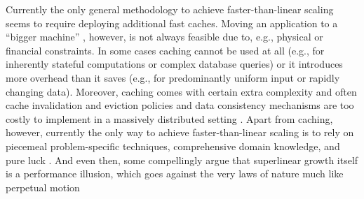 Currently the only general methodology to achieve faster-than-linear scaling seems to require deploying additional fast caches. Moving an application to a ``bigger machine'' \cite{dobb-2}, however, is not always feasible due to, e.g., physical or financial constraints.  In some cases caching cannot be used at all (e.g., for inherently stateful computations or complex database queries) or it introduces more overhead than it saves (e.g., for predominantly uniform input or rapidly changing data).  Moreover, caching comes with certain extra complexity and often cache invalidation and eviction policies and data consistency mechanisms are too costly to implement in a massively distributed setting \cite{271208}. Apart from caching, however, currently the only way to achieve faster-than-linear scaling is to rely on piecemeal problem-specific techniques, comprehensive domain knowledge, and pure luck \cite{7733347, 80148}. And even then, some compellingly argue that superlinear growth itself is a performance illusion, which goes against the very laws of nature much like perpetual motion \cite{gunther-hotsos, 10.1145/2773212.2789974}




